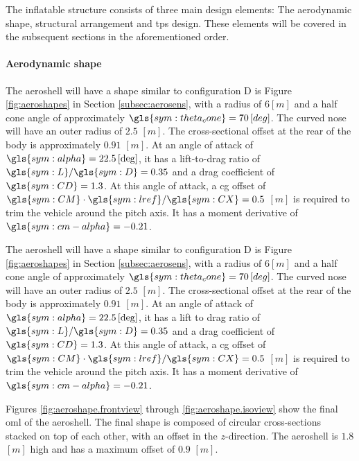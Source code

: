 The inflatable structure consists of three main design elements: The aerodynamic shape, structural arrangement and \gls{tps} design. These elements will be covered in the subsequent sections in the aforementioned order.

\paragraph{Aerodynamic shape}
The aeroshell will have a shape similar to configuration D is Figure \ref{fig:aeroshapes} in Section \ref{subsec:aerosens}, with a radius of $6 \left[m\right]$ and a half cone angle of approximately $\gls{sym:theta_cone} = 70 \left[deg\right]$. The curved nose will have an outer radius of $2.5$ $\left[m\right]$. The cross-sectional offset at the rear of the body is approximately $0.91$ $\left[m\right]$. At an angle of attack of $\gls{sym:alpha} = 22.5 \left[\deg\right]$, it has a lift-to-drag ratio of $\gls{sym:L}/\gls{sym:D} = 0.35$ and a drag coefficient of $\gls{sym:CD} = 1.3$. At this angle of attack, a \gls{cg} offset of $\gls{sym:CM}\cdot \gls{sym:lref}/\gls{sym:CX} = 0.5$ $\left[m\right]$ is required to trim the vehicle around the pitch axis. It has a moment derivative of $\gls{sym:cm-alpha} = -0.21$. 
 
The aeroshell will have a shape similar to configuration D is Figure \ref{fig:aeroshapes} in Section \ref{subsec:aerosens}, with a radius of $6 \left[m\right]$ and a half cone angle of approximately $\gls{sym:theta_cone} = 70 \left[deg\right]$. The curved nose will have an outer radius of $2.5$ $\left[m\right]$. The cross-sectional offset at the rear of the body is approximately $0.91$ $\left[m\right]$. At an angle of attack of $\gls{sym:alpha} = 22.5 \left[\deg\right]$, it has a lift to drag ratio of $\gls{sym:L}/\gls{sym:D} = 0.35$ and a drag coefficient of $\gls{sym:CD} = 1.3$. At this angle of attack, a \gls{cg} offset of $\gls{sym:CM}\cdot \gls{sym:lref}/\gls{sym:CX} = 0.5$ $\left[m\right]$ is required to trim the vehicle around the pitch axis. It has a moment derivative of $\gls{sym:cm-alpha} = -0.21$. 

 Figures \ref{fig:aeroshape.frontview} through \ref{fig:aeroshape.isoview} show the final \gls{oml} of the aeroshell. The final shape is composed of circular cross-sections stacked on top of each other, with an offset in the $z$-direction. The aeroshell is $1.8$ $\left[m\right]$ high and has a maximum offset of $0.9$ $\left[m\right]$.
 
